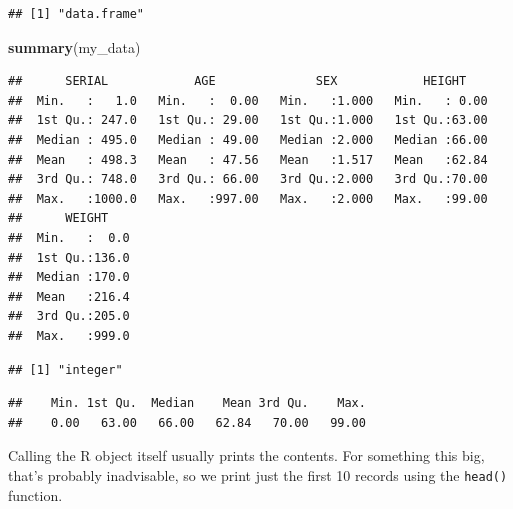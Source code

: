 \documentclass[
]{book}
\newenvironment{Shaded}{\begin{snugshade}}{\end{snugshade}}
\newcommand{\FunctionTok}[1]{\textcolor[rgb]{0.13,0.29,0.53}{\textbf{#1}}}
\newcommand{\NormalTok}[1]{#1}
\newcommand{\SpecialCharTok}[1]{\textcolor[rgb]{0.81,0.36,0.00}{\textbf{#1}}}
\begin{document}
\begin{verbatim}
## [1] "data.frame"
\end{verbatim}

\begin{Shaded}
\begin{Highlighting}[]
\FunctionTok{summary}\NormalTok{(my\_data)}
\end{Highlighting}
\end{Shaded}

\begin{verbatim}
##      SERIAL            AGE              SEX            HEIGHT     
##  Min.   :   1.0   Min.   :  0.00   Min.   :1.000   Min.   : 0.00  
##  1st Qu.: 247.0   1st Qu.: 29.00   1st Qu.:1.000   1st Qu.:63.00  
##  Median : 495.0   Median : 49.00   Median :2.000   Median :66.00  
##  Mean   : 498.3   Mean   : 47.56   Mean   :1.517   Mean   :62.84  
##  3rd Qu.: 748.0   3rd Qu.: 66.00   3rd Qu.:2.000   3rd Qu.:70.00  
##  Max.   :1000.0   Max.   :997.00   Max.   :2.000   Max.   :99.00  
##      WEIGHT     
##  Min.   :  0.0  
##  1st Qu.:136.0  
##  Median :170.0  
##  Mean   :216.4  
##  3rd Qu.:205.0  
##  Max.   :999.0
\end{verbatim}

\begin{Shaded}
\end{Shaded}

\begin{verbatim}
## [1] "integer"
\end{verbatim}

\begin{Shaded}
\end{Shaded}

\begin{verbatim}
##    Min. 1st Qu.  Median    Mean 3rd Qu.    Max. 
##    0.00   63.00   66.00   62.84   70.00   99.00
\end{verbatim}

Calling the R object itself usually prints the contents. For something this big, that's probably inadvisable, so we print just the first 10 records using the \texttt{head()} function.
\end{document}
